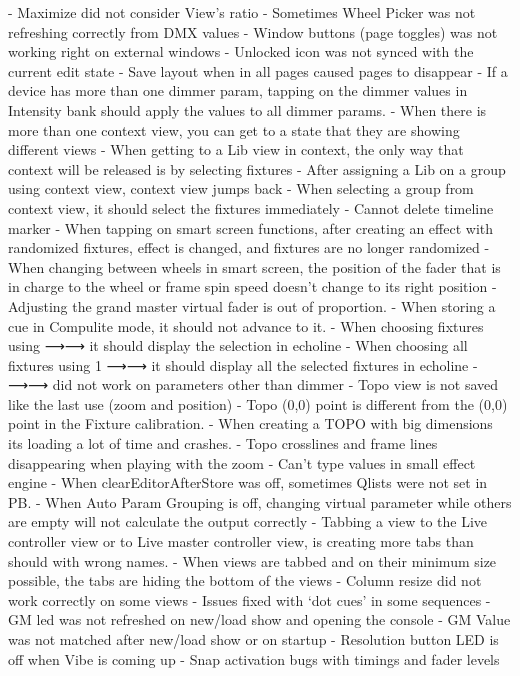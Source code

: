\documentclass[
]{article}
\begin{document}
- Maximize did not consider View's ratio
- Sometimes Wheel Picker was not refreshing correctly from DMX values
- Window buttons (page toggles) was not working right on external windows
- Unlocked icon was not synced with the current edit state
- Save layout when in all pages caused pages to disappear
- If a device has more than one dimmer param, tapping on the dimmer values in Intensity bank should apply the values to all dimmer params.
- When there is more than one context view, you can get to a state that they are showing different views
- When getting to a Lib view in context, the only way that context will be released is by selecting fixtures
- After assigning a Lib on a group using context view, context view jumps back
- When selecting a group from context view, it should select the fixtures immediately
- Cannot delete timeline marker
- When tapping on smart screen functions, after creating an effect with randomized fixtures, effect is changed, and fixtures are no longer randomized
- When changing between wheels in smart screen, the position of the fader that is in charge to the wheel or frame spin speed doesn't change to its right position
- Adjusting the grand master virtual fader is out of proportion.
- When storing a cue in Compulite mode, it should not advance to it.
- When choosing fixtures using ⟶⟶ it should display the selection in echoline
- When choosing all fixtures using 1 ⟶⟶ it should display all the selected fixtures in echoline
- ⟶⟶ did not work on parameters other than dimmer
- Topo view is not saved like the last use (zoom and position)
- Topo (0,0) point is different from the (0,0) point in the Fixture calibration.
- When creating a TOPO with big dimensions its loading a lot of time and crashes.
- Topo crosslines and frame lines disappearing when playing with the zoom
- Can't type values in small effect engine
- When clearEditorAfterStore was off, sometimes Qlists were not set in PB.
- When Auto Param Grouping is off, changing virtual parameter while others are empty will not calculate the output correctly
- Tabbing a view to the Live controller view or to Live master controller view, is creating more tabs than should with wrong names.
- When views are tabbed and on their minimum size possible, the tabs are hiding the bottom of the views
- Column resize did not work correctly on some views
- Issues fixed with `dot cues' in some sequences
- GM led was not refreshed on new/load show and opening the console
- GM Value was not matched after new/load show or on startup
- Resolution button LED is off when Vibe is coming up
- Snap activation bugs with timings and fader levels
\end{document}
